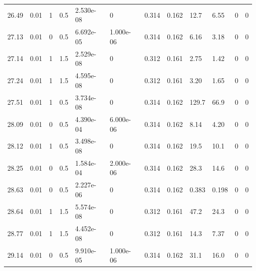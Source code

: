 \documentclass[preview]{standalone}
\begin{document}
{{{\begin{tabular}{L{1.2cm}C{1.2cm} C{0.3cm}C{0.5cm} C{1.4cm}C{1.4cm} C{1.4cm}C{1.4cm} C{1.6cm}C{1.6cm} C{1.6cm}C{1.6cm}}
  26.49  &  0.01  & 1     & 0.5 &  2.530e-08  & 0  &  0.314&   0.162& 12.7 & 6.55   &  0 & 0  \\ 
  27.13  &  0.01  & 0     & 0.5 &  6.692e-05  & 1.000e-06  &  0.314&   0.162& 6.16 & 3.18   &  0 & 0  \\ 
  27.14  &  0.01  & 1     & 1.5 &  2.529e-08  & 0  &  0.312&   0.161& 2.75 & 1.42   &  0 & 0  \\ 
  27.24  &  0.01  & 1     & 1.5 &  4.595e-08  & 0  &  0.312&   0.161& 3.20 & 1.65   &  0 & 0  \\ 
  27.51  &  0.01  & 1     & 0.5 &  3.734e-08  & 0  &  0.314&   0.162& 129.7 & 66.9   &  0 & 0  \\ 
  28.09  &  0.01  & 0     & 0.5 &  4.390e-04  & 6.000e-06  &  0.314&   0.162& 8.14 & 4.20   &  0 & 0  \\ 
  28.12  &  0.01  & 1     & 0.5 &  3.498e-08  & 0  &  0.314&   0.162& 19.5 & 10.1   &  0 & 0  \\ 
  28.25  &  0.01  & 0     & 0.5 &  1.584e-04  & 2.000e-06  &  0.314&   0.162& 28.3 & 14.6   &  0 & 0  \\ 
  28.63  &  0.01  & 0     & 0.5 &  2.227e-06  & 0  &  0.314&   0.162& 0.383 & 0.198   &  0 & 0  \\ 
  28.64  &  0.01  & 1     & 1.5 &  5.574e-08  & 0  &  0.312&   0.161& 47.2 & 24.3   &  0 & 0  \\ 
  28.77  &  0.01  & 1     & 1.5 &  4.452e-08  & 0  &  0.312&   0.161& 14.3 & 7.37   &  0 & 0  \\ 
  29.14  &  0.01  & 0     & 0.5 &  9.910e-05  & 1.000e-06  &  0.314&   0.162& 31.1 & 16.0   &  0 & 0  \\ 
\hline 
\end{tabular} 

}}}
\end{document}

